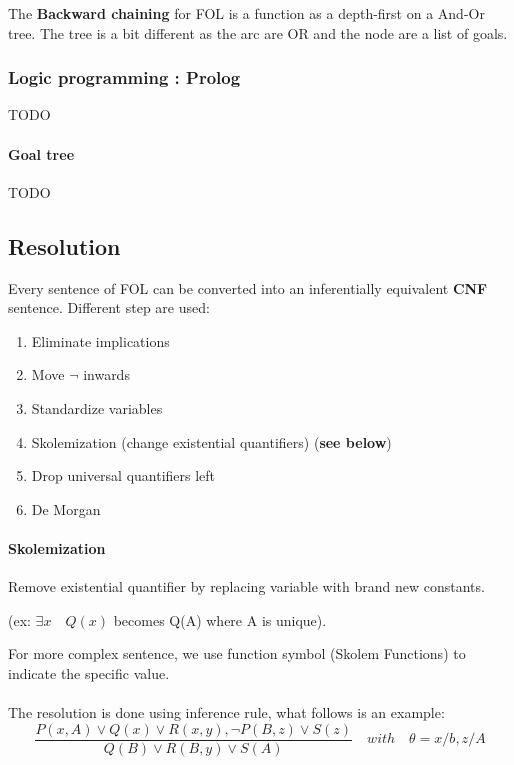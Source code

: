     The  \textbf{Backward  chaining}   for  FOL  is  a   function  as  a
depth-first on a And-Or tree. The tree is a bit different as the arc are
OR and the node are a list of goals.

\subsubsection{Logic programming : Prolog}
TODO

\paragraph{Goal tree}
TODO

\subsection{Resolution} 
Every sentence of FOL can  be converted into an inferentially equivalent
\textbf{CNF} sentence. Different step are used:
	\begin{enumerate}
		\item Eliminate implications
		\item Move $\neg$ inwards
		\item Standardize variables
        \item Skolemization (change existential quantifiers) (\textbf{see below}) 
		\item Drop universal quantifiers left
		\item De Morgan
	\end{enumerate} 

\paragraph{Skolemization}  Remove  existential quantifier  by  replacing
variable with  brand new  constants.

(ex: $\exists  x \quad Q(x)$  becomes Q(A) where  A is unique).  

For more complex sentence, we  use function symbol (Skolem Functions) to
indicate the specific value.

\paragraph{}
The resolution is done using inference rule, what follows is an example:\\
$$\frac{P(x,A)\vee Q(x) \vee R(x,y), \neg P(B,z)\vee S(z)}{Q(B) \vee R(B,y)\vee S(A)}\quad with\quad \theta 
= {x/b,z/A}$$

